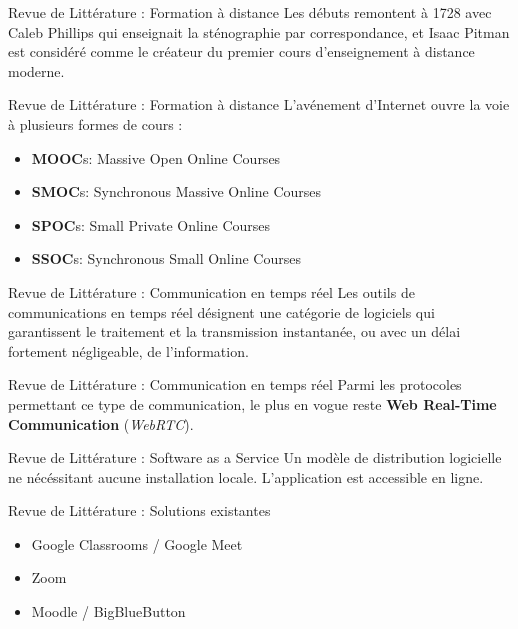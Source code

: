 \documentclass{beamer}
\begin{document}
\begin{frame}{Revue de Littérature : \small{Formation à distance}}
  Les débuts remontent à 1728 avec 
  Caleb Phillips qui enseignait la sténographie par correspondance, 
  et Isaac Pitman est considéré comme le créateur du premier cours 
  d'enseignement à distance moderne.
\end{frame}

\begin{frame}{Revue de Littérature : \small{Formation à distance}}
  L'avénement d'Internet ouvre la voie à plusieurs formes de cours :
  \begin{itemize}
    \item \textbf{MOOC}s: Massive Open Online Courses
    \item \textbf{SMOC}s: Synchronous Massive Online Courses
    \item \textbf{SPOC}s: Small Private Online Courses
    \item \textbf{SSOC}s: Synchronous Small Online Courses
  \end{itemize}
\end{frame}

\begin{frame}{Revue de Littérature : \small{Communication en temps réel}}
  Les outils de communications en temps réel désignent une catégorie de 
  logiciels qui garantissent le traitement et la transmission instantanée, 
  ou avec un délai fortement négligeable, de l’information.
\end{frame}

\begin{frame}{Revue de Littérature : \small{Communication en temps réel}}
  Parmi les protocoles 
  permettant ce type de communication, le plus en vogue reste \textbf{Web Real-Time Communication} (\textit{WebRTC}).
\end{frame}

\begin{frame}{Revue de Littérature : \small{ Software as a Service}}
  Un modèle de distribution logicielle ne nécéssitant aucune installation locale. L'application est accessible en ligne.
\end{frame}

\begin{frame}{Revue de Littérature : \small{Solutions existantes}}
  \begin{itemize}
    \item Google Classrooms / Google Meet
    \item Zoom
    \item Moodle / BigBlueButton
  \end{itemize}
\end{frame}
\end{document}
